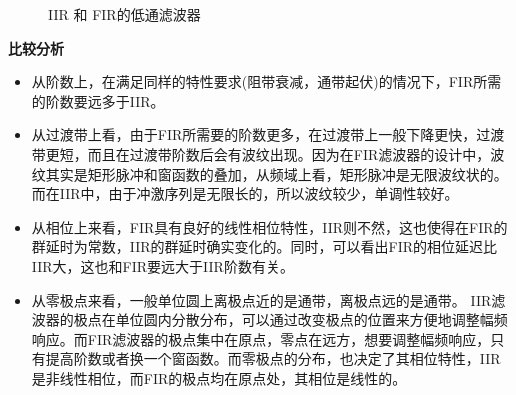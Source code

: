 \documentclass[UTF8]{ctexart}
\begin{document}
\begin{figure}[H]
	\centering	
	\quad
	\caption{IIR 和 FIR的低通滤波器}
\end{figure}
\textbf{比较分析}
\begin{itemize}
	\item 从阶数上，在满足同样的特性要求(阻带衰减，通带起伏)的情况下，FIR所需的阶数要远多于IIR。
	\item 从过渡带上看，由于FIR所需要的阶数更多，在过渡带上一般下降更快，过渡带更短，而且在过渡带阶数后会有波纹出现。因为在FIR滤波器的设计中，波纹其实是矩形脉冲和窗函数的叠加，从频域上看，矩形脉冲是无限波纹状的。而在IIR中，由于冲激序列是无限长的，所以波纹较少，单调性较好。
	\item 从相位上来看，FIR具有良好的线性相位特性，IIR则不然，这也使得在FIR的群延时为常数，IIR的群延时确实变化的。同时，可以看出FIR的相位延迟比IIR大，这也和FIR要远大于IIR阶数有关。
	\item 从零极点来看，一般单位圆上离极点近的是通带，离极点远的是通带。
	IIR滤波器的极点在单位圆内分散分布，可以通过改变极点的位置来方便地调整幅频响应。而FIR滤波器的极点集中在原点，零点在远方，想要调整幅频响应，只有提高阶数或者换一个窗函数。而零极点的分布，也决定了其相位特性，IIR是非线性相位，而FIR的极点均在原点处，其相位是线性的。
\end{itemize}
\end{document}
